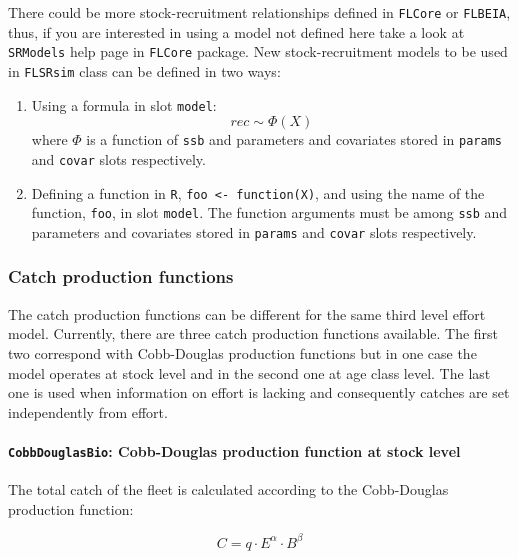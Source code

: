   There could be more stock-recruitment relationships defined in \texttt{FLCore} or \texttt{FLBEIA}, thus, 
  if you are interested in using 
        a model not defined here take a look at \texttt{SRModels} help page in \texttt{FLCore} package. 
        New stock-recruitment models to be used in \texttt{FLSRsim} class can be defined in two ways:
               
		\begin{enumerate}
			\item Using a formula in slot \texttt{model}:
					$$ rec \sim \Phi(X)$$
				where $\Phi$ is a function of \texttt{ssb} and parameters and covariates stored in \texttt{params} and  \texttt{covar} slots
				respectively.
			\item Defining a function in \texttt{R}, \texttt{foo <- function(X)}, and using the name of the function, \texttt{foo}, 
					in slot \texttt{model}. The function arguments must be among \texttt{ssb} and parameters and covariates stored in
					\texttt{params} and  \texttt{covar} slots respectively.
					 
		\end{enumerate}
        

\subsubsection{Catch production functions} \label{sec:CprodFun}

	The catch production functions can be different for the same third level effort model.
	Currently, there are three catch production functions available. 
	The first two correspond with Cobb-Douglas production functions \citep{Clark1990, Cobb1928}
	but in one case the model operates at stock level and in the second one at age class level.
	The last one is used when information on effort is lacking and consequently catches are
	set independently from effort.
 	
 	\paragraph{\texttt{CobbDouglasBio}: Cobb-Douglas production function at stock level} \hspace{0pt} \smallskip
 	
 	The total catch of the fleet is calculated according to the Cobb-Douglas production function:
		
\begin{equation}  \label{eq:Cobb_Doug}
	C = q\cdot E^{\alpha} \cdot B^{\beta}
\end{equation}

